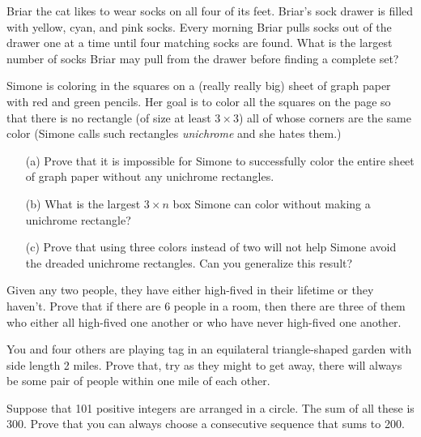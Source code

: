\documentclass{article}
\begin{document}
\begin{exercise}
    Briar the cat likes to wear socks on all four of its feet. 
    Briar's sock drawer is filled with yellow, cyan, and pink socks. 
    Every morning Briar pulls socks out of the drawer one at a time until four matching socks are found. 
    What is the largest number of socks Briar may pull from the drawer before finding a complete set?
\end{exercise}

\begin{exercise}
    Simone is coloring in the squares on a (really really big) sheet of graph paper with red and green pencils. 
    Her goal is to color all the squares on the page so that there is no rectangle (of size at least \(3\times 3\)) all of whose corners are the same color (Simone calls such rectangles \textit{unichrome} and she hates them.) 
    \begin{enumerate}
        \item[(a)] Prove that it is impossible for Simone to successfully color the entire sheet of graph paper without any unichrome rectangles.
        \item[(b)] What is the largest \(3\times n\) box Simone can color without making a unichrome rectangle?
        \item[(c)] Prove that using three colors instead of two will not help Simone avoid the dreaded unichrome rectangles.
        Can you generalize this result?
    \end{enumerate}
\end{exercise}

\begin{exercise}
    Given any two people, they have either high-fived in their lifetime or they haven't.
    Prove that if there are 6 people in a room, then there are three of them who either all high-fived one another or who have never high-fived one another.
\end{exercise}

\begin{exercise}
    You and four others are playing tag in an equilateral triangle-shaped garden with side length 2 miles.
    Prove that, try as they might to get away, there will always be some pair of people within one mile of each other.
\end{exercise}

\begin{exercise}
    Suppose that 101 positive integers are arranged in a circle.
    The sum of all these is 300.
    Prove that you can always choose a consecutive sequence that sums to 200.
\end{exercise}
\end{document}
